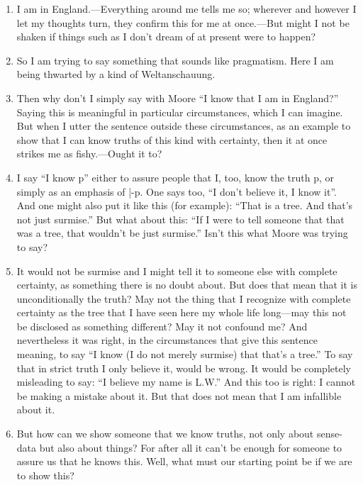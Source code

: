 \documentclass{book}
\begin{document}
\begin{enumerate}
\item
I am in England.---Everything around me tells me so; wherever and however I let
my thoughts turn, they confirm this for me at once.---But might I not be shaken
if things such as I don't dream of at present were to happen?

\item
So I am trying to say something that sounds like pragmatism.  Here I am being
thwarted by a kind of Weltanschauung.

\item
Then why don't I simply say with Moore ``I know that I am in England?'' Saying
this is meaningful in particular circumstances, which I can imagine. But when I
utter the sentence outside these circumstances, as an example to show that I
can know truths of this kind with certainty, then it at once strikes me as
fishy.---Ought it to?

\item
I say ``I know p'' either to assure people that I, too, know the truth p, or
simply as an emphasis of |-p. One says too, ``I don't believe it, I know it''.
And one might also put it like this (for example): ``That is a tree. And that's
not just surmise.'' But what about this: ``If I were to tell someone that that
was a tree, that wouldn't be just surmise.'' Isn't this what Moore was trying
to say?

\item
It would not be surmise and I might tell it to someone else with complete
certainty, as something there is no doubt about. But does that mean that it is
unconditionally the truth? May not the thing that I recognize with complete
certainty as the tree that I have seen here my whole life long---may this not
be disclosed as something different? May it not confound me?  And nevertheless
it was right, in the circumstances that give this sentence meaning, to say ``I
know (I do not merely surmise) that that's a tree.'' To say that in strict
truth I only believe it, would be wrong. It would be completely misleading to
say: ``I believe my name is L.W.'' And this too is right: I cannot be making a
mistake about it. But that does not mean that I am infallible about it.

\item
But how can we show someone that we know truths, not only about sense-data but
also about things? For after all it can't be enough for someone to assure us
that he knows this.  Well, what must our starting point be if we are to show
this?


\end{enumerate}
\end{document}
